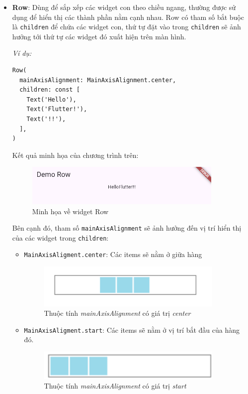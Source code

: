 \documentclass[../DoAn.tex]{subfiles}
\numberwithin{figure}{chapter}
\begin{document}
\begin{itemize}
\item \textbf{Row}: Dùng để sắp xếp các widget con theo chiều ngang, thường được sử dụng để hiển thị các thành phần nằm cạnh nhau. Row có tham số bắt buộc là \texttt{children} để chứa các widget con, thứ tự đặt vào trong \texttt{children} sẽ ảnh hưởng tới thứ tự các widget đó xuất hiện trên màn hình.

\textit{Ví dụ:}

\begin{lstlisting}
Row(
  mainAxisAlignment: MainAxisAlignment.center,
  children: const [
    Text('Hello'),
    Text('Flutter!'),
    Text('!!'),
  ],
)
\end{lstlisting}

Kết quả minh họa của chương trình trên:
\begin{figure}[H]
    \centering
    \includegraphics[width=0.9\textwidth]{Hinhve/Chuong5/rowWidget.png}
    \caption{Minh họa về widget Row}
    \label{fig:rowwidget}
\end{figure}

Bên cạnh đó, tham số \texttt{mainAxisAlignment} sẽ ảnh hưởng đến vị trí hiển thị của các widget trong \texttt{children}:
\begin{itemize}
\item \texttt{MainAxisAligment.center}: Các items sẽ nằm ở giữa hàng
\begin{figure}[H]
    \centering
    \includegraphics[width=0.9\textwidth]{Hinhve/Chuong5/mainAxAlcenter.png}
    \caption{Thuộc tính \textit{mainAxisAlignment} có giá trị \textit{center}}
    \label{fig:rowwidget(center)}
\end{figure}
\item \texttt{MainAxisAligment.start}: Các items sẽ nằm ở vị trí bắt đầu của hàng đó.
\begin{figure}[H]
    \centering
    \includegraphics[width=0.9\textwidth]{Hinhve/Chuong5/mainAxAlstart.png}
    \caption{Thuộc tính \textit{mainAxisAlignment} có giá trị \textit{start}}
    \label{fig:rowwidget(start)}
\end{figure}


\end{itemize}
\end{itemize}
\end{document}
